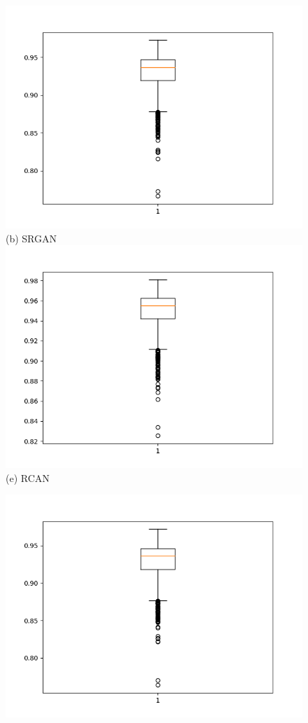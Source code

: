 \documentclass[conference]{IEEEtran}
\begin{document}
\begin{figure}[h!]
\begin{minipage}{0.3\textwidth}
  \includegraphics[width=\textwidth,height=0.2\textheight]{Figures/srgan_ssim_Y.png}
  (b) SRGAN 
  \includegraphics[width=\textwidth,height=0.2\textheight]{Figures/rcan_ssim_Y.png}
  (e) RCAN 
  \end{minipage}%
  \begin{minipage}{0.3\textwidth}
  \centering
  \includegraphics[width=\textwidth,height=0.2\textheight]{Figures/cyclegan_ssim_Y.png}

\end{minipage}
\end{figure}
\end{document}
